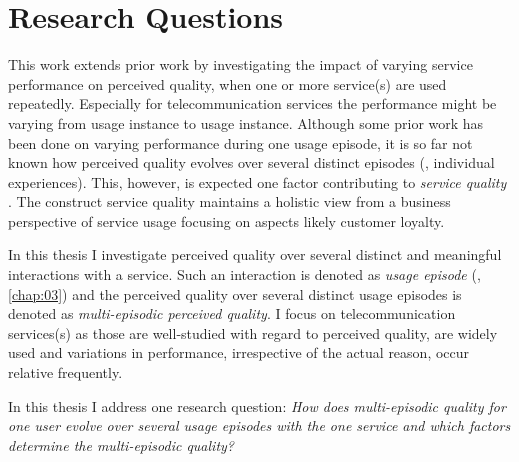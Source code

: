 \section{Research Questions}
This work extends prior work by investigating the impact of varying service performance on perceived quality, when one or more service(s) are used repeatedly.
Especially for telecommunication services the performance might be varying from usage instance to usage instance.
Although some prior work has been done on varying performance during one usage episode, it is so far not known how perceived quality evolves over several distinct episodes (\ie, individual experiences).
This, however, is expected one factor contributing to \emph{service quality} \citep[\cf,][]{zeithaml_behavioral_1996}.
The construct service quality maintains a holistic view from a business perspective of service usage focusing on aspects likely customer loyalty.

In this thesis I investigate perceived quality over several distinct and meaningful interactions with a service.
Such an interaction is denoted as \emph{usage episode} (\cf, \autoref{chap:03}) and the perceived quality over several distinct usage episodes is denoted as \emph{multi-episodic perceived quality}.
I focus on telecommunication services(s) as those are well-studied with regard to perceived quality, are widely used and variations in performance, irrespective of the actual reason, occur relative frequently.

In this thesis I address one research question: \emph{How does multi-episodic quality for one user evolve over several usage episodes with the one service and which factors determine the multi-episodic quality?}


